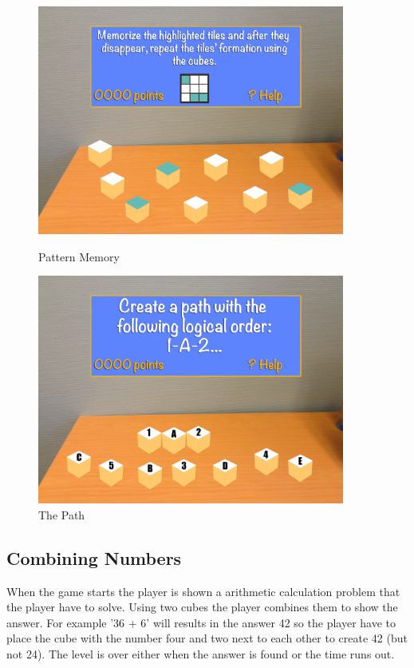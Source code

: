 \begin{figure}[h]
	\centering
	\begin{minipage}{.5\textwidth}
		\capstart
		\centering
		\includegraphics[width=0.9\textwidth]{images/Costas/game_mockup3(matrix).jpg}
		\vspace{-10pt}
		\caption{Pattern Memory}
		\label{fig:Costas_pattern_memory}
	\end{minipage}%
	\begin{minipage}{.5\textwidth}
		\capstart
		\centering
		\includegraphics[width=0.9\textwidth]{images/Costas/game_mockup5(path).jpg}
		\vspace{-10pt}
		\caption{The Path}
		\label{fig:Costas_the_path}
	\end{minipage}%
\end{figure}

\subsection{Combining Numbers}
\label{game:combining_numbers}
When the game starts the player is shown a arithmetic calculation problem that the player have to solve. Using two cubes the player combines them to show the answer. For example '36 + 6' will results in the answer 42 so the player have to place the cube with the number four and two next to each other to create 42 (but not 24).
The level is over either when the answer is found or the time runs out.

